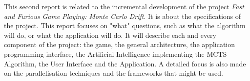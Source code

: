 This second report is related to the incremental development of the project \textit{Fast and Furious Game Playing: Monte Carlo Drift}. It is about the specifications of the project.
This report focuses on "what" questions, such as what the algorithm will do, or what the application will do. It will describe each and every component of the project: the game, the general architecture, the application programming interface, the Artificial Intelligence implementing the MCTS Algorithm, the User Interface and the Application. A detailed focus is also made on the parallelisation techniques and the frameworks that might be used.